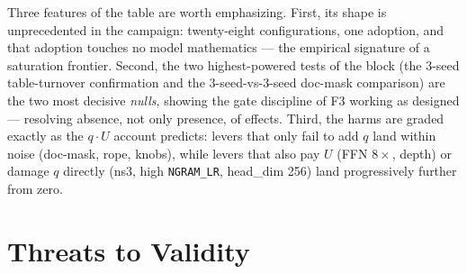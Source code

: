 \documentclass{article}
\begin{document}
Three features of the table are worth emphasizing. First, its shape is unprecedented in the campaign: twenty-eight configurations, one adoption, and that adoption touches no model mathematics --- the empirical signature of a saturation frontier. Second, the two highest-powered tests of the block (the 3-seed table-turnover confirmation and the 3-seed-vs-3-seed doc-mask comparison) are the two most decisive \emph{nulls}, showing the gate discipline of F3 working as designed --- resolving absence, not only presence, of effects. Third, the harms are graded exactly as the $q \cdot U$ account predicts: levers that only fail to add $q$ land within noise (doc-mask, rope, knobs), while levers that also pay $U$ (FFN $8\times$, depth) or damage $q$ directly (ns3, high \texttt{NGRAM\_LR}, head\_dim 256) land progressively further from zero.

\section{Threats to Validity}
\label{sec:threats}
\end{document}

